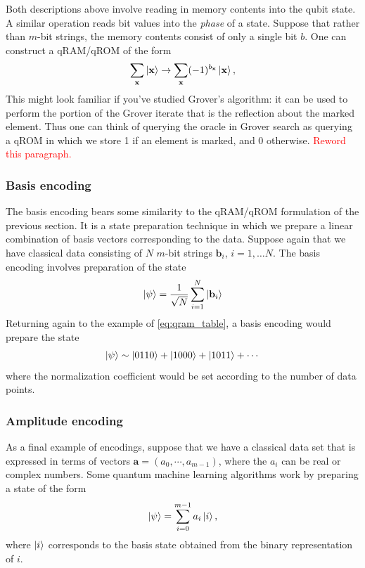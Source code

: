 \documentclass[a4paper,12pt]{article}
\newcommand\todo[1]{\textcolor{red}{#1}}
\begin{document}
Both descriptions above involve reading in memory contents into the qubit state. 
A similar operation reads bit values into the \emph{phase} of a state.
Suppose that rather than $m$-bit strings, the memory contents consist of only a single bit $b$.
One can construct a qRAM/qROM of the form 
\begin{equation}
 \sum_{\mathbf{x}} \ket{\mathbf{x}}  \rightarrow \sum_{\mathbf{x}} (-1)^{b_{\mathbf{x}}} \ket{\mathbf{x}},
\end{equation}
This might look familiar if you've studied Grover's algorithm: it can be used to perform the portion of the Grover iterate that is the reflection about the marked element.
Thus one can think of querying the oracle in Grover search as querying a qROM in which we store 1 if an element is marked, and 0 otherwise. 
\todo{Reword this paragraph.}

\subsubsection{Basis encoding}

The basis encoding bears some similarity to the qRAM/qROM formulation of the previous section.
It is a state preparation technique in which we prepare a linear combination of basis vectors corresponding to the data.
Suppose again that we have classical data consisting of $N$ $m$-bit strings $\mathbf{b}_i$, $i = 1, \ldots N$.
The basis encoding involves preparation of the state
\begin{equation}
 \ket{\psi} = \frac{1}{\sqrt{N}} \sum_{i=1}^{N} \ket{\mathbf{b}_i}
\end{equation}
Returning again to the example of \autoref{eq:qram_table}, a basis encoding would prepare the state
\begin{equation}
 \ket{\psi} \sim \ket{0110} + \ket{1000} + \ket{1011} + \cdots
\end{equation}
where the normalization coefficient would be set according to the number of data points.

\subsubsection{Amplitude encoding}

As a final example of encodings, suppose that we have a classical data set that is expressed in terms of vectors  $\mathbf{a} = \left( a_0, \cdots,  a_{m-1} \right)$, where the $a_i$ can be real or complex numbers.
Some quantum machine learning algorithms work by preparing a state of the form 
\begin{equation}
 \ket{\psi} = \sum_{i=0}^{m-1} a_i \ket{i},
\end{equation}
where $\ket{i}$ corresponds to the basis state obtained from the binary representation of $i$.
\end{document}
